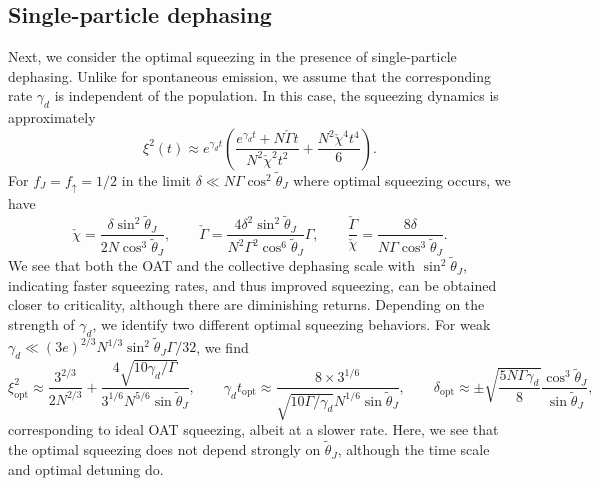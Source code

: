 \documentclass[11pt]{article}
\begin{document}
\subsection{Single-particle dephasing}

Next, we consider the optimal squeezing in the presence of single-particle dephasing. Unlike for spontaneous emission, we assume that the corresponding rate $\gamma_d$ is independent of the population. In this case, the squeezing dynamics is approximately
\begin{equation}
    \xi^2(t) \approx e^{\gamma_d t}\left(\frac{e^{\gamma_d t} + N \check{\Gamma} t}{N^2 \check{\chi}^2 t^2} + \frac{N^2 \check{\chi}^4 t^4}{6} \right).
\end{equation}
For $f_J = f_{\uparrow} = 1/2$ in the limit $\delta \ll N \Gamma \cos^2 \tilde{\theta}_J$ where optimal squeezing occurs, we have
\begin{equation}
    \check{\chi} = \frac{ \delta \sin^2 \tilde{\theta}_J}{2 N \cos^3 \tilde{\theta}_J}, \qquad \check{\Gamma} = \frac{4 \delta^2 \sin^2 \tilde{\theta}_J}{N^2 \Gamma^2 \cos^6 \tilde{\theta}_J} \Gamma, \qquad \frac{\check{\Gamma}}{\check{\chi}} = \frac{8 \delta}{N \Gamma \cos^3 \tilde{\theta}_J}.
\end{equation}
We see that both the OAT and the collective dephasing scale with $\sin^2 \tilde{\theta}_J$, indicating faster squeezing rates, and thus improved squeezing, can be obtained closer to criticality, although there are diminishing returns. Depending on the strength of $\gamma_d$, we identify two different optimal squeezing behaviors. For weak $\gamma_d \ll (3 e)^{2/3} N^{1/3} \sin^2 \tilde{\theta}_J \Gamma/32$, we find
\begin{equation}
    \xi^2_{\text{opt}} \approx \frac{3^{2/3}}{2 N^{2/3}} + \frac{4 \sqrt{10 \gamma_d/\Gamma}}{3^{1/6} N^{5/6} \sin \tilde{\theta}_J}, \qquad \gamma_d t_{\text{opt}} \approx \frac{ 8 \times 3^{1/6}}{\sqrt{10 \Gamma /\gamma_d} N^{1/6} \sin \tilde{\theta}_J }, \qquad \delta_{\text{opt}} \approx \pm \sqrt{\frac{5 N \Gamma \gamma_d}{8}} \frac{\cos^3 \tilde{\theta}_J}{\sin \tilde{\theta}_J} ,
\end{equation}
corresponding to ideal OAT squeezing, albeit at a slower rate. Here, we see that the optimal squeezing does not depend strongly on $\tilde{\theta}_J$, although the time scale and optimal detuning do.
\end{document}
